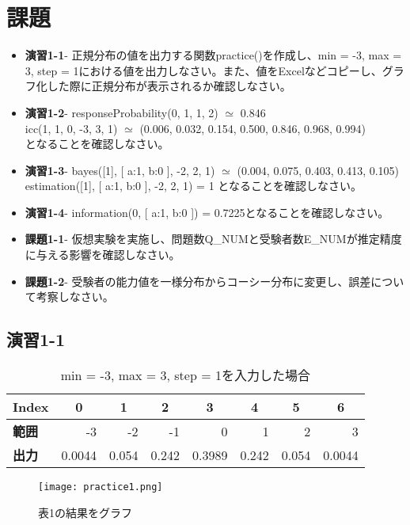 \documentclass[12pt]{jarticle}
\begin{document}
\section{課題}
\begin{itembox}[2]{\null}
	\begin{itemize}
	\item \textbf{演習1-1}- 正規分布の値を出力する関数practice()を作成し、min = -3, max = 3, step = 1における値を出力しなさい。また、値をExcelなどコピーし、グラフ化した際に正規分布が表示されるか確認しなさい。
	\item \textbf{演習1-2}- responseProbability(0, 1, 1, 2) $\simeq$ 0.846 \\  icc(1, 1, 0, -3, 3, 1) $\simeq$ (0.006, 0.032, 0.154, 0.500, 0.846, 0.968, 0.994)\\ となることを確認しなさい。
	\item \textbf{演習1-3}- bayes([1], [{ a:1, b:0 }], -2, 2, 1) $\simeq$ (0.004, 0.075, 0.403, 0.413, 0.105)\\ estimation([1], [{ a:1, b:0 }], -2, 2, 1) = 1 となることを確認しなさい。
	\item \textbf{演習1-4}- information(0, [{ a:1, b:0 }]) = 0.7225となることを確認しなさい。
	\item \textbf{課題1-1}- 仮想実験を実施し、問題数Q\_NUMと受験者数E\_NUMが推定精度に与える影響を確認しなさい。
	\item \textbf{課題1-2}- 受験者の能力値を一様分布からコーシー分布に変更し、誤差について考察しなさい。
	\end{itemize}
\end{itembox}
\subsection{演習1-1}
\begin{table}[H]
\centering
\caption{min = -3, max = 3, step = 1を入力した場合}
\label{tab:my-table}
\begin{tabular}{l|rrrrrrr}
\hline \hline
\textbf{Index} &
  \multicolumn{1}{c}{\textbf{0}} &
  \multicolumn{1}{c}{\textbf{1}} &
  \multicolumn{1}{c}{\textbf{2}} &
  \multicolumn{1}{c}{\textbf{3}} &
  \multicolumn{1}{c}{\textbf{4}} &
  \multicolumn{1}{c}{\textbf{5}} &
  \multicolumn{1}{c}{\textbf{6}} \\ \hline
\textbf{範囲} &
  -3 &
  -2 &
  -1 &
  0 &
  1 &
  2 &
  3 \\
\textbf{出力} &
  0.0044 &
  0.054 &
  0.242 &
  0.3989 &
  0.242 &
  0.054 &
  0.0044 \\ \hline \hline
\end{tabular}
\end{table}
\begin{figure}[H]
 \centering
 \texttt{[image: practice1.png]}
 \caption{表1の結果をグラフ}
\end{figure}
\end{document}
